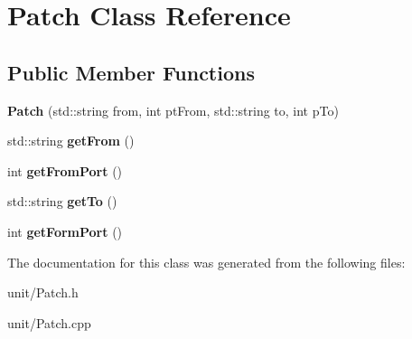\hypertarget{classPatch}{}\section{Patch Class Reference}
\label{classPatch}
\subsection*{Public Member Functions}
\begin{DoxyCompactItemize}
\item 
{\bfseries Patch} (std\+::string from, int pt\+From, std\+::string to, int p\+To)\hypertarget{classPatch_a5ff9de0f83c44aa11aae837870aa55f0}{}\label{classPatch_a5ff9de0f83c44aa11aae837870aa55f0}

\item 
std\+::string {\bfseries get\+From} ()\hypertarget{classPatch_a97b08ef9e08c5ef8b5d71692a7242796}{}\label{classPatch_a97b08ef9e08c5ef8b5d71692a7242796}

\item 
int {\bfseries get\+From\+Port} ()\hypertarget{classPatch_a365988c401459bfd0f0b5b21f041bfe1}{}\label{classPatch_a365988c401459bfd0f0b5b21f041bfe1}

\item 
std\+::string {\bfseries get\+To} ()\hypertarget{classPatch_ade1fb3107faa8224f29c4a8387821fee}{}\label{classPatch_ade1fb3107faa8224f29c4a8387821fee}

\item 
int {\bfseries get\+Form\+Port} ()\hypertarget{classPatch_a19e489d67f86b80ac5f0ef774a3b87c8}{}\label{classPatch_a19e489d67f86b80ac5f0ef774a3b87c8}

\end{DoxyCompactItemize}


The documentation for this class was generated from the following files\+:\begin{DoxyCompactItemize}
\item 
unit/Patch.\+h\item 
unit/Patch.\+cpp\end{DoxyCompactItemize}
